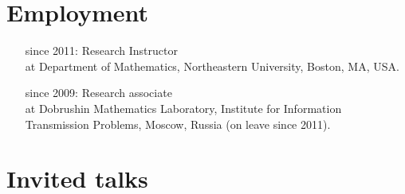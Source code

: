 \documentclass[letterpaper,11pt]{article}
\begin{document}
\section*{Employment}

\begin{itemize}
\item[since 2011:]
Research Instructor\\ at
Department of Mathematics,
Northeastern University, Boston, MA, USA.

\item[since 2009:]
Research associate\\
at
Dobrushin Mathematics Laboratory,
Institute for Information Transmission Problems, Moscow, Russia (on leave since 2011).
\end{itemize}

\section*{Invited talks}
\end{document}

